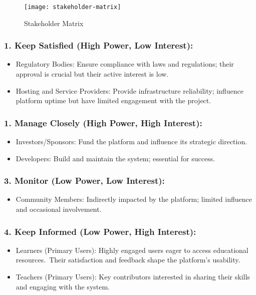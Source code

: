 \begin{figure}[h]
    \centering
    \texttt{[image: stakeholder-matrix]}
    \caption{Stakeholder Matrix}
    \label{fig:figure1}
\end{figure}

\subsubsection*{1. Keep Satisfied (High Power, Low Interest):}
\begin{itemize}
\item Regulatory Bodies: Ensure compliance with laws and regulations; their approval is crucial but their active interest is low.
\item Hosting and Service Providers: Provide infrastructure reliability; influence platform uptime but have limited engagement with the project.
\end{itemize}

\subsubsection*{1. Manage Closely (High Power, High Interest):}
\begin{itemize}
\item Investors/Sponsors: Fund the platform and influence its strategic direction.
\item Developers: Build and maintain the system; essential for success.
\end{itemize}

\subsubsection*{3. Monitor (Low Power, Low Interest):}
\begin{itemize}
\item Community Members: Indirectly impacted by the platform; limited influence and occasional involvement.
\end{itemize}

\subsubsection*{4. Keep Informed (Low Power, High Interest):}
\begin{itemize}
\item Learners (Primary Users): Highly engaged users eager to access educational resources.\ Their satisfaction and feedback shape the platform’s usability.
\item Teachers (Primary Users): Key contributors interested in sharing their skills and engaging with the system.
\end{itemize}

